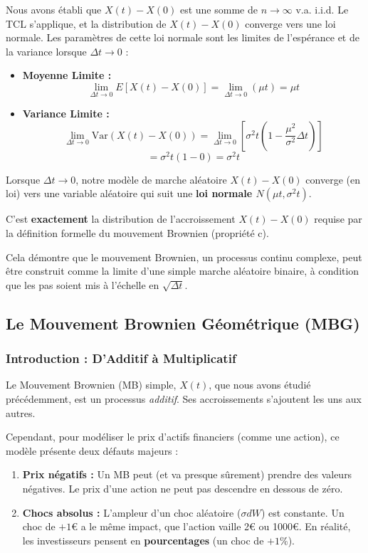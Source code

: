 Nous avons établi que $X(t) - X(0)$ est une somme de $n \to \infty$ v.a. i.i.d. Le TCL s'applique, et la distribution de $X(t) - X(0)$ converge vers une loi normale.
Les paramètres de cette loi normale sont les limites de l'espérance et de la variance lorsque $\Delta t \to 0$ :

\begin{itemize}
    \item \textbf{Moyenne Limite :} 
    $$ \lim_{\Delta t \to 0} E[X(t) - X(0)] = \lim_{\Delta t \to 0} (\mu t) = \mu t $$
    
    \item \textbf{Variance Limite :} 
    $$ \lim_{\Delta t \to 0} \text{Var}(X(t) - X(0)) = \lim_{\Delta t \to 0} \left[ \sigma^2 t \left( 1 - \frac{\mu^2}{\sigma^2} \Delta t \right) \right] $$
    $$ = \sigma^2 t (1 - 0) = \sigma^2 t $$
\end{itemize}

\begin{intuitionbox}[Conclusion]
Lorsque $\Delta t \to 0$, notre modèle de marche aléatoire $X(t) - X(0)$ converge (en loi) vers une variable aléatoire qui suit une \textbf{loi normale $N(\mu t, \sigma^2 t)$}.

C'est \textbf{exactement} la distribution de l'accroissement $X(t) - X(0)$ requise par la définition formelle du mouvement Brownien (propriété c).

Cela démontre que le mouvement Brownien, un processus continu complexe, peut être construit comme la limite d'une simple marche aléatoire binaire, à condition que les pas soient mis à l'échelle en $\sqrt{\Delta t}$.
\end{intuitionbox}

\newpage
\subsection{Le Mouvement Brownien Géométrique (MBG)}

\subsubsection{Introduction : D'Additif à Multiplicatif}

Le Mouvement Brownien (MB) simple, $X(t)$, que nous avons étudié précédemment, est un processus \textit{additif}. Ses accroissements s'ajoutent les uns aux autres.

Cependant, pour modéliser le prix d'actifs financiers (comme une action), ce modèle présente deux défauts majeurs :
\begin{enumerate}
    \item \textbf{Prix négatifs :} Un MB peut (et va presque sûrement) prendre des valeurs négatives. Le prix d'une action ne peut pas descendre en dessous de zéro.
    \item \textbf{Chocs absolus :} L'ampleur d'un choc aléatoire ($\sigma dW$) est constante. Un choc de $+1€$ a le même impact, que l'action vaille 2€ ou 1000€. En réalité, les investisseurs pensent en \textbf{pourcentages} (un choc de $+1\%$).
\end{enumerate}

